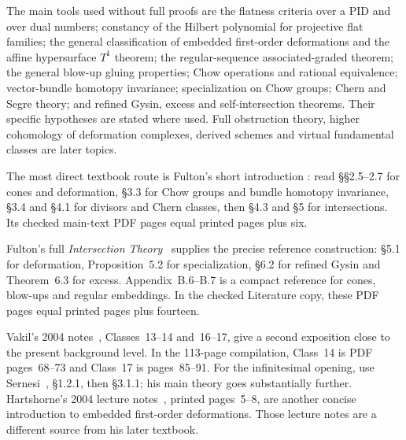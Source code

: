 \documentclass[11pt,a4paper]{article}
\numberwithin{equation}{section}
\theoremstyle{definition}
\begin{document}
The main tools used without full proofs are the flatness criteria
over a PID and over dual numbers; constancy of the Hilbert polynomial
for projective flat families; the general classification of embedded
first-order deformations and the affine hypersurface $T^1$ theorem;
the regular-sequence associated-graded theorem; the general blow-up
gluing properties; Chow operations and rational equivalence;
vector-bundle homotopy invariance; specialization on Chow groups;
Chern and Segre theory; and refined Gysin, excess and self-intersection
theorems. Their specific hypotheses are stated where used. Full
obstruction theory, higher cohomology of deformation complexes,
derived schemes and virtual fundamental classes are later topics.

The most direct textbook route is Fulton's short introduction
\cite{FIntro}: read \S\S2.5--2.7 for cones and deformation, \S3.3
for Chow groups and bundle homotopy invariance, \S3.4 and \S4.1
for divisors and Chern classes, then \S4.3 and \S5 for intersections.
Its checked main-text PDF pages equal printed pages plus six.

Fulton's full \emph{Intersection Theory}~\cite{Fulton} supplies the
precise reference construction: \S5.1 for deformation, Proposition~5.2
for specialization, \S6.2 for refined Gysin and Theorem~6.3 for excess.
Appendix~B.6--B.7 is a compact reference for cones, blow-ups and
regular embeddings. In the checked Literature copy, these PDF pages
equal printed pages plus fourteen.

Vakil's 2004 notes~\cite{Vakil}, Classes~13--14 and~16--17, give
a second exposition close to the present background level. In the
113-page compilation, Class~14 is PDF pages~68--73 and Class~17
is pages~85--91. For the infinitesimal opening, use Sernesi~\cite{Sernesi},
\S1.2.1, then \S3.1.1; his main theory goes substantially further.
Hartshorne's 2004 lecture notes~\cite{HartDef}, printed pages~5--8,
are another concise introduction to embedded first-order deformations.
Those lecture notes are a different source from his later textbook.
\end{document}
